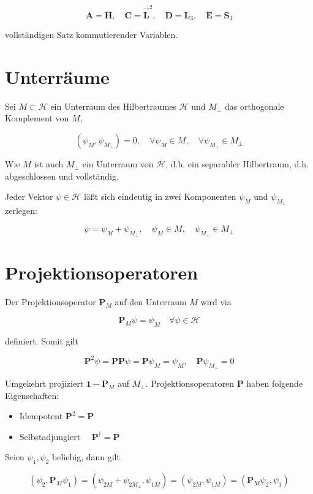 \documentclass[10pt, letterpaper]{article}
\begin{document}
$$
\mathbf{A}=\mathbf{H}, \quad \mathbf{C}=\overrightarrow{\mathbf{L}}^{2}, \quad \mathbf{D}=\mathbf{L}_{3}, \quad \mathbf{E}=\mathbf{S}_{3}
$$

vollständigen Satz kommutierender Variablen.

\section*{Unterräume}
Sei $M \subset \mathcal{H}$ ein Unterraum des Hilbertraumes $\mathcal{H}$ und $M_{\perp}$ das orthogonale Komplement von $M$,

$$
\left(\psi_{M}, \psi_{M_{\perp}}\right)=0, \quad \forall \psi_{M} \in M, \quad \forall \psi_{M_{\perp}} \in M_{\perp}
$$

Wie $M$ ist auch $M_{\perp}$ ein Unterraum von $\mathcal{H}$, d.h. ein separabler Hilbertraum, d.h. abgeschlossen und vollständig.

Jeder Vektor $\psi \in \mathcal{H}$ läßt sich eindeutig in zwei Komponenten $\psi_{M}$ und $\psi_{M_{\perp}}$ zerlegen:

$$
\psi=\psi_{M}+\psi_{M_{\perp}}, \quad \psi_{M} \in M, \quad \psi_{M_{\perp}} \in M_{\perp}
$$

\section*{Projektionsoperatoren}
Der Projektionsoperator $\mathbf{P}_{M}$ auf den Unterraum $M$ wird via

$$
\mathbf{P}_{M} \psi=\psi_{M} \quad \forall \psi \in \mathcal{H}
$$

definiert. Somit gilt

$$
\mathbf{P}^{2} \psi=\mathbf{P} \mathbf{P} \psi=\mathbf{P} \psi_{M}=\psi_{M}, \quad \mathbf{P} \psi_{M_{\perp}}=0
$$

Umgekehrt projiziert $\mathbf{1 -} \mathbf{P}_{M}$ auf $M_{\perp}$. Projektionsoperatoren $\mathbf{P}$ haben folgende Eigenschaften:

\begin{itemize}
  \item Idempotent $\mathbf{P}^{2}=\mathbf{P}$
  \item Selbstadjungiert $\quad \mathbf{P}^{\dagger}=\mathbf{P}$
\end{itemize}

Seien $\psi_{1}, \psi_{2}$ beliebig, dann gilt

$$
\left(\psi_{2}, \mathbf{P}_{M} \psi_{1}\right)=\left(\psi_{2 M}+\psi_{2 M_{\perp}}, \psi_{1 M}\right)=\left(\psi_{2 M}, \psi_{1 M}\right)=\left(\mathbf{P}_{M} \psi_{2}, \psi_{1}\right)
$$
\end{document}
